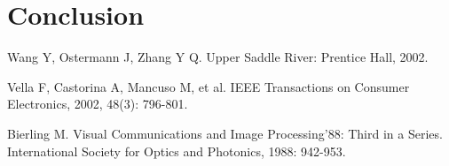\documentclass[a4paper, twocolumn]{article}
\begin{document}
	\section{Conclusion}
	
	
	
	\begin{thebibliography}{99} %
		
		Wang Y, Ostermann J, Zhang Y Q. 
		\newblock Upper Saddle River: Prentice Hall, 2002.
		
		Vella F, Castorina A, Mancuso M, et al. 
		\newblock IEEE Transactions on Consumer Electronics, 2002, 48(3): 796-801.
		
		Bierling M. 
		\newblock Visual Communications and Image Processing'88: Third in a Series. International Society for Optics and Photonics, 1988: 942-953.
		
	\end{thebibliography}
	
	
\end{document}
